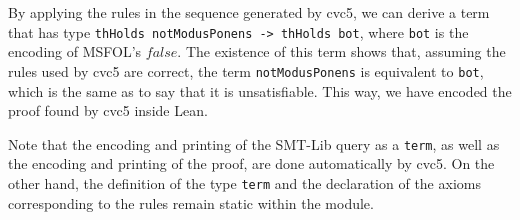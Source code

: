 By applying the rules in the sequence generated by cvc5, we can derive a term
that has type \texttt{thHolds notModusPonens -> thHolds bot}, where \texttt{bot}
is the encoding of MSFOL's $false$.
%
The existence of this term shows that, assuming the rules used by cvc5 are correct, the term \texttt{notModusPonens} is equivalent to \texttt{bot}, which is the same as to say that it is unsatisfiable. This way, we have encoded the proof found by cvc5 inside Lean.

Note that the encoding and printing of the SMT-Lib query as a \texttt{term}, as well as the encoding and printing of the proof, are done automatically by cvc5. On the other hand, the definition of the type \texttt{term} and the declaration of the axioms corresponding to the rules remain static within the module.
